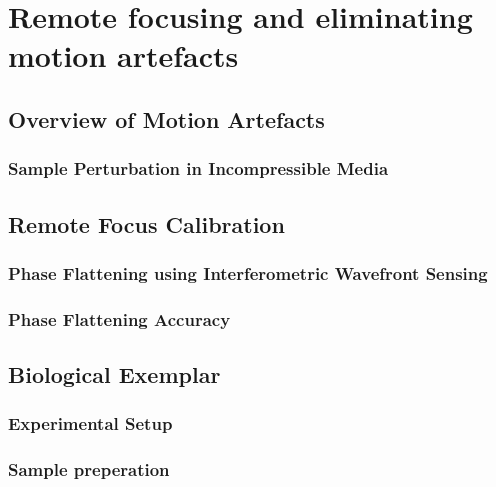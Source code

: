 \chapter{Remote focusing and eliminating motion artefacts}

\section{Overview of Motion Artefacts}
\label{sec:motion_artifacts}

\subsection{Sample Perturbation in Incompressible Media}
\label{subsec:sample_perturbation}

\section{Remote Focus Calibration}
\label{sec:remote_focus_calibration}

\subsection{Phase Flattening using Interferometric Wavefront Sensing}
\label{subsec:phase_flattening}

\subsection{Phase Flattening Accuracy}
\label{subsec:phase_flattening_accuracy}

\section{Biological Exemplar}
\label{sec:RF_biology}

\subsection{Experimental Setup}
\label{subsec:RF_setup}

\subsection{Sample preperation}
\label{subsec:RF_sample_prep}